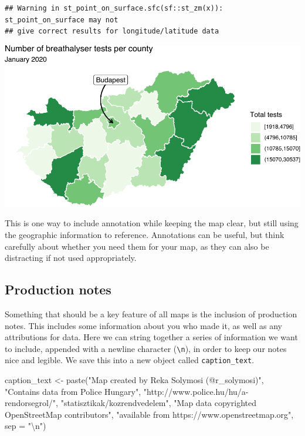 \documentclass[
]{book}
\newenvironment{Shaded}{\begin{snugshade}}{\end{snugshade}}
\newcommand{\AttributeTok}[1]{\textcolor[rgb]{0.77,0.63,0.00}{#1}}
\newcommand{\FunctionTok}[1]{\textcolor[rgb]{0.00,0.00,0.00}{#1}}
\newcommand{\NormalTok}[1]{#1}
\newcommand{\OtherTok}[1]{\textcolor[rgb]{0.56,0.35,0.01}{#1}}
\newcommand{\SpecialCharTok}[1]{\textcolor[rgb]{0.00,0.00,0.00}{#1}}
\newcommand{\StringTok}[1]{\textcolor[rgb]{0.31,0.60,0.02}{#1}}
\begin{document}
\begin{verbatim}
## Warning in st_point_on_surface.sfc(sf::st_zm(x)): st_point_on_surface may not
## give correct results for longitude/latitude data
\end{verbatim}

\includegraphics{crime_mapping_files/figure-latex/unnamed-chunk-162-1.pdf}

This is one way to include annotation while keeping the map clear, but still using the geographic information to reference. Annotations can be useful, but think carefully about whether you need them for your map, as they can also be distracting if not used appropriately.

\hypertarget{production-notes}{%
\subsection{Production notes}\label{production-notes}}

Something that should be a key feature of all maps is the inclusion of production notes. This includes some information about you who made it, as well as any attributions for data. Here we can string together a series of information we want to include, appended with a newline character (\texttt{\textbackslash{}n}), in order to keep our notes nice and legible. We save this into a new object called \texttt{caption\_text}.

\begin{Shaded}
\begin{Highlighting}[]
\NormalTok{caption\_text }\OtherTok{\textless{}{-}} \FunctionTok{paste}\NormalTok{(}\StringTok{"Map created by Reka Solymosi (@r\_solymosi)"}\NormalTok{, }
                       \StringTok{"Contains data from Police Hungary"}\NormalTok{,}
                       \StringTok{"http://www.police.hu/hu/a{-}rendorsegrol/"}\NormalTok{,}
                       \StringTok{"statisztikak/kozrendvedelem"}\NormalTok{, }
                       \StringTok{"Map data copyrighted OpenStreetMap contributors"}\NormalTok{, }
                       \StringTok{"available from https://www.openstreetmap.org"}\NormalTok{, }
                       \AttributeTok{sep =} \StringTok{"}\SpecialCharTok{\textbackslash{}n}\StringTok{"}\NormalTok{)}
\end{Highlighting}
\end{Shaded}
\end{document}
